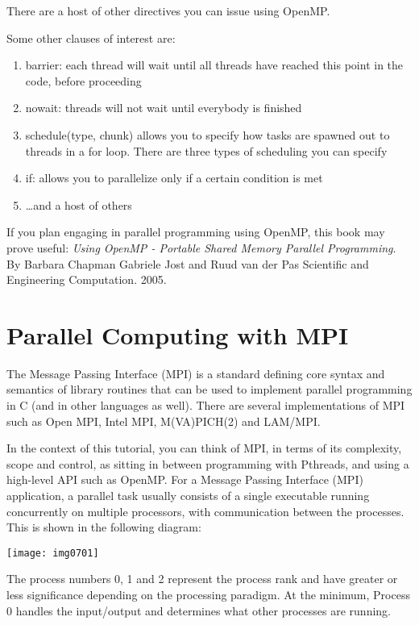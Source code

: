 There are a host of other directives you can issue using OpenMP.

Some other clauses of interest are:

\begin{enumerate}
\item  barrier: each thread will wait until all threads have reached this point in the code, before proceeding
\item  nowait: threads will not wait until everybody is finished
\item  schedule(type, chunk) allows you to specify how tasks are spawned out to threads in a for loop. There are three types of scheduling you can specify
\item  if: allows you to parallelize only if a certain condition is met
\item  \dots  and a host of others
\end{enumerate}

 If you plan engaging in parallel programming using OpenMP, this
book may prove useful: \textit{Using OpenMP - Portable Shared Memory Parallel
Programming}. By Barbara Chapman Gabriele Jost and Ruud van der Pas Scientific
and Engineering Computation. 2005.

\section{Parallel Computing with MPI }

The Message Passing Interface (MPI) is a standard defining core syntax and
semantics of library routines that can be used to implement parallel
programming in C (and in other languages as well). There are several
implementations of MPI such as Open MPI, Intel MPI, M(VA)PICH(2) and LAM/MPI.

In the context of this tutorial, you can think of MPI, in terms of its
complexity, scope and control, as sitting in between programming with Pthreads,
and using a high-level API such as OpenMP. For a Message Passing Interface
(MPI) application, a parallel task usually consists of a single executable
running concurrently on multiple processors, with communication between the
processes.  This is shown in the following diagram:

\texttt{[image: img0701]}

The process numbers 0, 1 and 2 represent the process rank and have greater or
less significance depending on the processing paradigm. At the minimum, Process
0 handles the input/output and determines what other processes are running.

